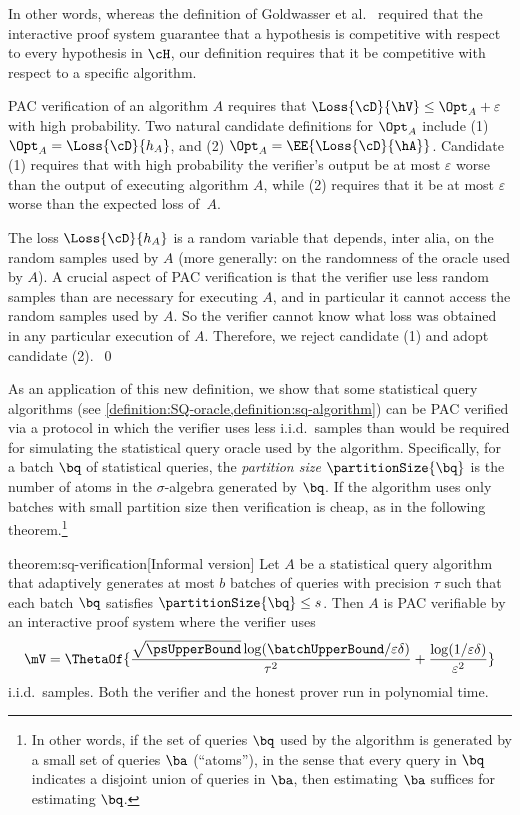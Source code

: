 \documentclass{toc}
\begin{document}
In other words, whereas the definition of Goldwasser et al.\ \cite{GoldwasserRSY21} required that the interactive proof system guarantee that a hypothesis is competitive with respect to every hypothesis in $\cH$, our definition requires that it be competitive with respect to a specific algorithm.  

\begin{remark}
	PAC verification of an algorithm $A$ requires that $\Loss{\cD}{\hV} \leq \Opt_A + \varepsilon$ with high probability. Two natural candidate definitions for $\Opt_A$ include (1) $\Opt_A = \Loss{\cD}{h_A}$, and (2) $\Opt_A = \EE{\Loss{\cD}{\hA}}$. Candidate (1) requires that with high probability the verifier's output be at most $\varepsilon$ worse than the output of executing algorithm $A$, while (2) requires that it be at most $\varepsilon$ worse than the expected loss of~$A$.

	The loss $\Loss{\cD}{h_A}$ is a random variable that depends, inter alia, on the random samples used by $A$ (more generally: on the randomness of the oracle used by $A$). A crucial aspect of PAC verification is that the verifier use less random samples than are necessary for executing $A$, and in particular it cannot access the random samples used by $A$. So the verifier cannot know what loss was obtained in any particular execution of $A$. Therefore, we reject candidate (1) and adopt candidate (2).~\qed
\end{remark}

As an application of this new definition, we show that some statistical query algorithms (see \cref{definition:SQ-oracle,definition:sq-algorithm}) can be PAC verified via a protocol in which the verifier uses less i.i.d.\ samples than would be required for simulating the statistical query oracle used by the algorithm. Specifically, for a batch $\bq$ of statistical queries, the \emph{partition size} $\partitionSize{\bq}$ is the number of atoms in the $\sigma$-algebra generated by $\bq$. If the algorithm uses only batches with small partition size then verification is cheap, as in the following theorem.\footnote{%
	In other words, if the set of queries $\bq$ used by the algorithm is generated by a small set of queries $\ba$ (``atoms''), in the sense that every query in $\bq$ indicates a disjoint union of queries in $\ba$, then estimating $\ba$ suffices for estimating $\bq$.
}

\begin{reptheorem}{theorem:sq-verification}[Informal version]
	Let $A$ be a statistical query algorithm that adaptively generates at most $b$ batches of queries with precision $\tau$ such that each batch $\bq$ satisfies $\partitionSize{\bq} \leq s$.	Then $A$ is PAC verifiable by an interactive proof system where the verifier uses
	\[
		\mV = \ThetaOf{\frac{\sqrt{\psUpperBound}\log(\batchUpperBound/\varepsilon\delta)}{\tau^2} + \frac{\log(1/\varepsilon\delta)}{\varepsilon^2}}
	\]
	i.i.d.\ samples. Both the verifier and the honest prover run in polynomial time.
\end{reptheorem}
\end{document}
